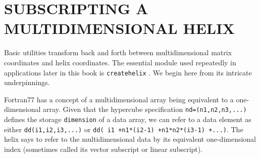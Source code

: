
\section{SUBSCRIPTING A MULTIDIMENSIONAL HELIX}
Basic utilities transform back and forth between
multidimensional matrix coordinates and helix coordinates.
The essential module used repeatedly in applications
later in this book is
\texttt{createhelix} .
We begin here from its intricate underpinnings.

\par
Fortran77 has a concept of a multidimensional array being equivalent
to a one-dimensional array.
Given that the hypercube specification
\texttt{nd=(n1,n2,n3,...)} defines the storage
\texttt{dimension} of a data array,
we can refer to a data element as either
\texttt{dd(i1,i2,i3,...)} or 
\texttt{dd( i1 +n1*(i2-1) +n1*n2*(i3-1) +...)}.
The helix says to refer to the multidimensional data
by its equivalent one-dimensional index
(sometimes called its vector subscript or linear subscript).

